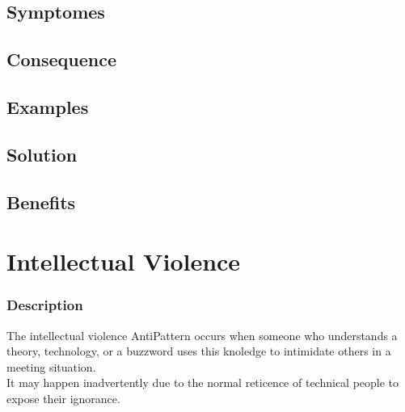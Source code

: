 \documentclass{beamer}
\begin{document}
\subsection{Symptomes}
\begin{frame}
\frametitle{}
\end{frame}

\subsection{Consequence}
\begin{frame}
\frametitle{}
\end{frame}

\subsection{Examples}
\begin{frame}
\frametitle{}
\end{frame}

\subsection{Solution}
\begin{frame}
\frametitle{}
\end{frame}

\subsection{Benefits}
\begin{frame}
\frametitle{}
\end{frame}

\section{Intellectual Violence}
\begin{frame}
\frametitle{Description}
The intellectual violence AntiPattern occurs when someone who understands a theory, technology, or a buzzword uses this knoledge to intimidate others in a meeting situation.\\
It may happen inadvertently due to the normal reticence of technical people to expose their ignorance.
\end{frame}
\end{document}
